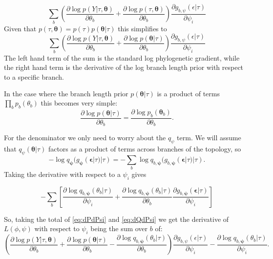 \documentclass{article}
\begin{document}
\[
    \sum_b
    \left(
        \frac{\partial \log p(Y | \tau, \bm\theta)}{\partial \theta_b}
        +
        \frac{\partial \log p(\tau, \bm\theta)}{\partial \theta_b}
    \right)
    \frac{\partial g_{b,\psi}(\epsilon | \tau)}{\partial \psi_i}
\]
Given that $p(\tau, \bm\theta) = p(\tau) p(\bm\theta | \tau)$ this simplifies to
\begin{equation}
    \sum_b
    \left(
        \frac{\partial \log p(Y | \tau, \bm\theta)}{\partial \theta_b}
        +
        \frac{\partial \log p(\bm\theta | \tau)}{\partial \theta_b}
    \right)
    \frac{\partial g_{b,\psi}(\epsilon | \tau)}{\partial \psi_i}
    \label{eq:dPdPsi}
\end{equation}
The left hand term of the sum is the standard log phylogenetic gradient, while the right hand term is the derivative of the log branch length prior with respect to a specific branch.

In the case where the branch length prior $p(\bm\theta | \tau)$ is a product of terms $\prod_b p_b(\theta_b)$ this becomes very simple:
\[
    \frac{\partial \log p(\bm\theta | \tau)}{\partial \theta_b} =
    \frac{\partial \log p_b(\bm\theta_b)}{\partial \theta_b}.
\]

For the denominator we only need to worry about the $q_\psi$ term.
We will assume that $q_\psi(\bm\theta | \tau)$ factors as a product of terms across branches of the topology, so
\[
    - \log q_{\bm{\psi}}(g_{\bm{\psi}}(\bm{\epsilon}|\tau)|\tau) =
    - \sum_b \log q_{b, \bm{\psi}}(g_{b, \bm{\psi}}(\bm{\epsilon}|\tau)|\tau).
\]
Taking the derivative with respect to a $\psi_i$ gives

\begin{equation}
    - \sum_b
    \left[
        \frac{\partial \log q_{b, \bm{\psi}}(\theta_b | \tau)}{\partial \psi_i} +
        \frac{\partial \log q_{b, \bm{\psi}}(\theta_b | \tau)}{\partial \theta_b}
        \frac{\partial g_{b, \bm{\psi}}(\bm{\epsilon}|\tau)}{\partial \psi_i}
    \right]
    \label{eq:dQdPsi}
\end{equation}

So, taking the total of \eqref{eq:dPdPsi} and \eqref{eq:dQdPsi} we get the derivative of $L(\phi, \psi)$ with respect to $\psi_i$ being the sum over $b$ of:
\begin{equation*}
        \left(
            \frac{\partial \log p(Y | \tau, \bm\theta)}{\partial \theta_b}
            +
            \frac{\partial \log p(\bm\theta | \tau)}{\partial \theta_b}
            -
            \frac{\partial \log q_{b, \bm{\psi}}(\theta_b | \tau)}{\partial \theta_b}
        \right)
        \frac{\partial g_{b,\psi}(\epsilon | \tau)}{\partial \psi_i}
        - \frac{\partial \log q_{b, \bm{\psi}}(\theta_b | \tau)}{\partial \psi_i}.
\end{equation*}
\end{document}

